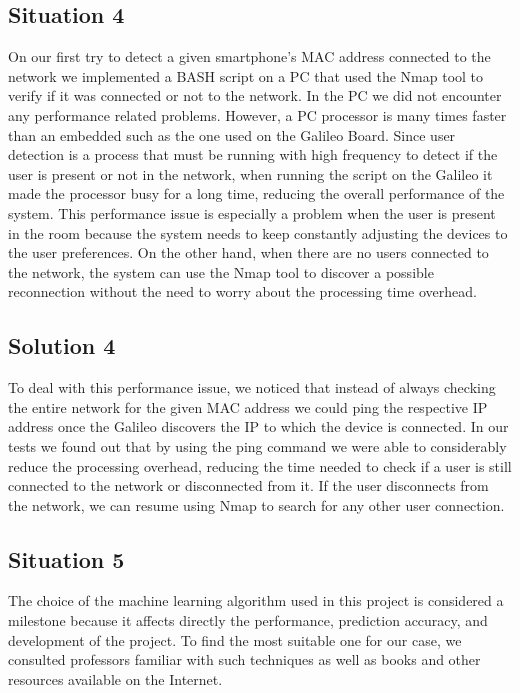 \documentclass[12pt]{partialreport}
\begin{document}
\subsection*{Situation 4}
On our first try to detect a given smartphone's MAC address connected to the network we implemented a BASH script on a PC that used the Nmap tool to verify if it was connected or not to the network. In the PC we did not encounter any performance related problems. However, a PC processor is many times faster than an embedded such as the one used on the Galileo Board. Since user detection is a process that must be running with high frequency to detect if the user is present or not in the network, when running the script on the Galileo it made the processor busy for a long time, reducing the overall performance of the system. This performance issue is especially a problem when the user is present in the room because the system needs to keep constantly adjusting the devices to the user preferences. On the other hand, when there are no users connected to the network, the system can use the Nmap tool to discover a possible reconnection without the need to worry about the processing time overhead.

\subsection*{Solution 4}
To deal with this performance issue, we noticed that instead of always checking the entire network for the given MAC address we could ping the respective IP address once the Galileo discovers the IP to which the device is connected. In our tests we found out that by using the ping command we were able to considerably reduce the processing overhead, reducing the time needed to check if a user is still connected to the network or disconnected from it. If the user disconnects from the network, we can resume using Nmap to search for any other user connection.


\subsection*{Situation 5}
The choice of the machine learning algorithm used in this project is considered a milestone because it affects directly the performance, prediction accuracy, and development of the project. To find the most suitable one for our case, we consulted professors familiar with such techniques as well as books and other resources available on the Internet.
\end{document}
